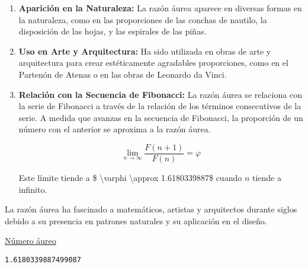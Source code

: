 \begin{enumerate}
\item
  \textbf{Aparición en la Naturaleza:} La razón áurea aparece en
  diversas formas en la naturaleza, como en las proporciones de las
  conchas de nautilo, la disposición de las hojas, y las espirales de
  las piñas.
\item
  \textbf{Uso en Arte y Arquitectura:} Ha sido utilizada en obras de
  arte y arquitectura para crear estéticamente agradables proporciones,
  como en el Partenón de Atenas o en las obras de Leonardo da Vinci.
\item
  \textbf{Relación con la Secuencia de Fibonacci:} La razón áurea se
  relaciona con la serie de Fibonacci a través de la relación de los
  términos consecutivos de la serie. A medida que avanzas en la
  secuencia de Fibonacci, la proporción de un número con el anterior se
  aproxima a la razón áurea.

  \[ \lim_{{n \to \infty}} \frac{F(n+1)}{F(n)} = \varphi \]

  Este límite tiende a \$ \textbackslash varphi \textbackslash approx
  1.6180339887\$ cuando \(n\) tiende a infinito.
\end{enumerate}

La razón áurea ha fascinado a matemáticos, artistas y arquitectos
durante siglos debido a su presencia en patrones naturales y su
aplicación en el diseño.

\href{https://www.youtube.com/watch?v=aopHcOm7a-w}{Número áureo}

\begin{Shaded}
\begin{Highlighting}[]
\OperatorTok{=}
\OperatorTok{/}\OperatorTok{{-}}\NormalTok{)}
\end{Highlighting}
\end{Shaded}

\begin{verbatim}
1.6180339887499087

\end{verbatim}

